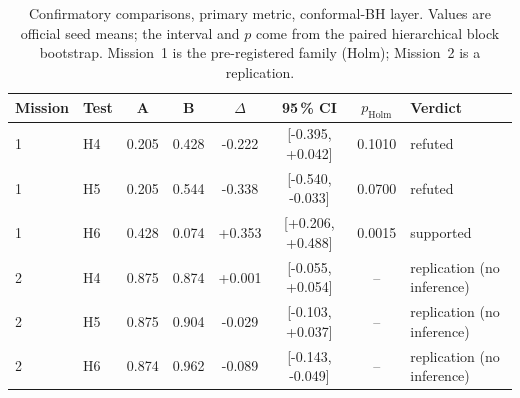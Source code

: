 \begin{table}[t]\centering\small
\caption{Confirmatory comparisons, primary metric, conformal-BH layer. Values are official seed means; the interval and $p$ come from the paired hierarchical block bootstrap. Mission~1 is the pre-registered family (Holm); Mission~2 is a replication.}\label{tab:confirmatory}
\begin{tabular}{llcccccl}\toprule
Mission & Test & A & B & $\Delta$ & 95\,\% CI & $p_{\mathrm{Holm}}$ & Verdict\\\midrule
1 & H4 & 0.205 & 0.428 & -0.222 & [-0.395, +0.042] & 0.1010 & refuted\\
1 & H5 & 0.205 & 0.544 & -0.338 & [-0.540, -0.033] & 0.0700 & refuted\\
1 & H6 & 0.428 & 0.074 & +0.353 & [+0.206, +0.488] & 0.0015 & supported\\
2 & H4 & 0.875 & 0.874 & +0.001 & [-0.055, +0.054] & -- & replication (no inference)\\
2 & H5 & 0.875 & 0.904 & -0.029 & [-0.103, +0.037] & -- & replication (no inference)\\
2 & H6 & 0.874 & 0.962 & -0.089 & [-0.143, -0.049] & -- & replication (no inference)\\
\bottomrule\end{tabular}\end{table}
